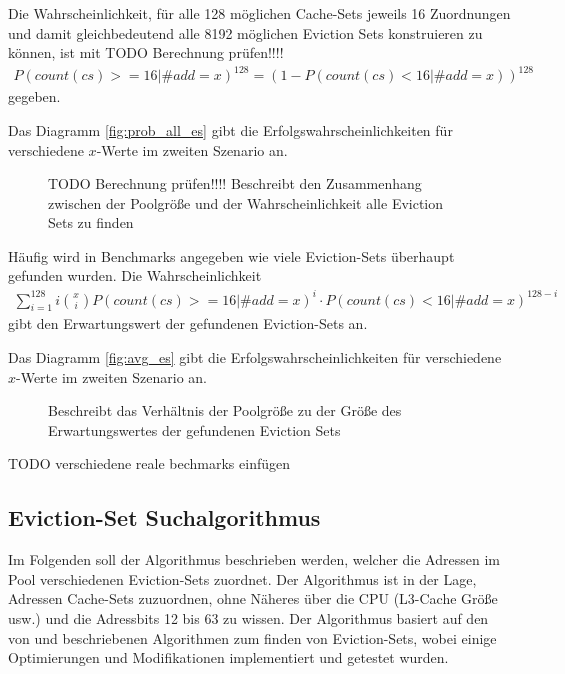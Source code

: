 Die Wahrscheinlichkeit, für alle 128 möglichen Cache-Sets jeweils 16 Zuordnungen und damit gleichbedeutend alle 8192 möglichen Eviction Sets konstruieren zu können, ist mit TODO Berechnung prüfen!!!!
\begin{align*}
P(count(cs)>=16|\#add = x)^{128} = (1-P(count(cs)<16|\#add = x))^{128}
\end{align*}
gegeben.  

Das Diagramm \ref{fig:prob_all_es} gibt die Erfolgswahrscheinlichkeiten für verschiedene $x$-Werte im zweiten Szenario an. 
\label{fig:prob_all_es}
\begin{figure}[h]
\centering
\begin{scaletikzpicturetowidth}{\textwidth}

\end{scaletikzpicturetowidth}
\caption{TODO Berechnung prüfen!!!! Beschreibt den Zusammenhang zwischen der Poolgröße und der Wahrscheinlichkeit alle Eviction Sets zu finden}
\end{figure}
Häufig wird in Benchmarks angegeben wie viele Eviction-Sets überhaupt gefunden wurden. Die Wahrscheinlichkeit 
\begin{align*}
\sum\limits_{i=1}^{128} i {x \choose i} P(count(cs)>=16|\#add = x)^i \cdot P(count(cs)<16|\#add = x)^{128-i} 
\end{align*}
gibt den Erwartungswert der gefundenen Eviction-Sets an.

Das Diagramm \ref{fig:avg_es} gibt die Erfolgswahrscheinlichkeiten für verschiedene $x$-Werte im zweiten Szenario an.
\label{fig:avg_es}
\begin{figure}[h]
\centering
\begin{scaletikzpicturetowidth}{\textwidth}

\end{scaletikzpicturetowidth}
\caption{Beschreibt das Verhältnis der Poolgröße zu der Größe des Erwartungswertes der gefundenen Eviction Sets}
\end{figure}

TODO verschiedene reale bechmarks einfügen 

\subsection{Eviction-Set Suchalgorithmus}

Im Folgenden soll der Algorithmus beschrieben werden, welcher die Adressen im Pool verschiedenen Eviction-Sets zuordnet.
Der Algorithmus ist in der Lage, Adressen Cache-Sets zuzuordnen, ohne Näheres über die CPU (L3-Cache Größe usw.) und die Adressbits 12 bis 63 zu wissen.
Der Algorithmus basiert auf den von \cite{DriveByPaper} und \cite{PrimeAndAbort} beschriebenen Algorithmen zum finden von Eviction-Sets, wobei einige Optimierungen und Modifikationen implementiert und getestet wurden.

